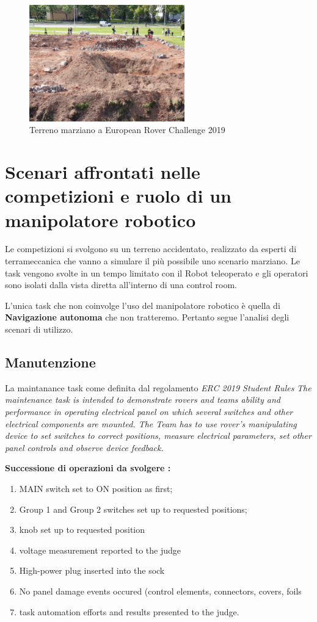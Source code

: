 \documentclass[%
corpo=11pt,
twoside,
 stile=classica,
oldstyle,
greek,%
]{toptesi}
\begin{document}
	\begin{figure}
		\centering
		\includegraphics[width=0.6\textwidth]{image/terrain.jpeg}
		\caption{Terreno marziano a European Rover Challenge 2019}
		\label{fig:ercterrain}
	\end{figure}

	\section{Scenari affrontati nelle competizioni e ruolo di un manipolatore robotico}
		Le competizioni si svolgono su un terreno accidentato, realizzato da esperti di terrameccanica che vanno a simulare il più possibile uno scenario marziano. 
		Le task vengono svolte in un tempo limitato con il Robot teleoperato e gli operatori sono isolati dalla vista diretta all'interno di una control room. 
		
		L'unica task che non coinvolge l'uso del manipolatore robotico è quella di \textbf{Navigazione autonoma} che non tratteremo. 
		Pertanto segue l'analisi degli scenari di utilizzo. 
		\subsection{Manutenzione}
		La  maintanance task come definita dal regolamento 
		\textit{ERC 2019 Student Rules} \cite{ERC2019} 
		\newline
		\textit{The maintenance task is intended to demonstrate rovers and teams ability and performance in operating electrical panel on which several switches and other electrical components are mounted. The Team has to use rover’s manipulating device to set switches to correct positions, measure electrical parameters, set other panel controls and observe device feedback.}

		\newline
		\textbf{Successione di operazioni da svolgere :}
		\begin{enumerate}
		\item MAIN switch set to ON position as first;
		\item Group 1 and Group 2 switches set up to requested positions;
		\item knob set up to requested position
		\item voltage measurement reported to the judge
		\item High-power plug inserted into the sock
		\item No panel damage events occured (control elements, connectors, covers, foils
		\item task automation efforts and results presented to the judge.	 
		\end{enumerate}
	
\end{document}
